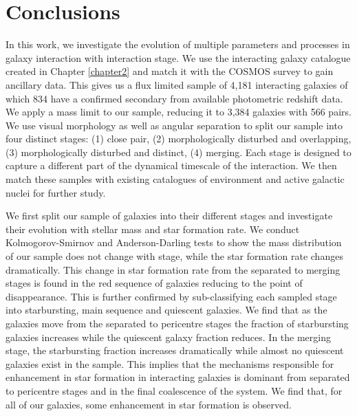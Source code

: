 \section{Conclusions}\label{conclusion}
\noindent In this work, we investigate the evolution of multiple parameters and processes in galaxy interaction with interaction stage. We use the interacting galaxy catalogue created in Chapter \ref{chapter2} and match it with the COSMOS survey to gain ancillary data. This gives us a flux limited sample of 4,181 interacting galaxies of which 834 have a confirmed secondary from available photometric redshift data. We apply a mass limit to our sample, reducing it to 3,384 galaxies with 566 pairs. We use visual morphology as well as angular separation to split our sample into four distinct stages: (1) close pair, (2) morphologically disturbed and overlapping, (3) morphologically disturbed and distinct, (4) merging. Each stage is designed to capture a different part of the dynamical timescale of the interaction. We then match these samples with existing catalogues of environment and active galactic nuclei for further study.

We first split our sample of galaxies into their different stages and investigate their evolution with stellar mass and star formation rate. We conduct Kolmogorov-Smirnov and Anderson-Darling tests to show the mass distribution of our sample does not change with stage, while the star formation rate changes dramatically. This change in star formation rate from the separated to merging stages is found in the red sequence of galaxies reducing to the point of disappearance. This is further confirmed by sub-classifying each sampled stage into starbursting, main sequence and quiescent galaxies. We find that as the galaxies move from the separated to pericentre stages the fraction of starbursting galaxies increases while the quiescent galaxy fraction reduces. In the merging stage, the starbursting fraction increases dramatically while almost no quiescent galaxies exist in the sample. This implies that the mechanisms responsible for enhancement in star formation in interacting galaxies is dominant from separated to pericentre stages and in the final coalescence of the system. We find that, for all of our galaxies, some enhancement in star formation is observed. 

